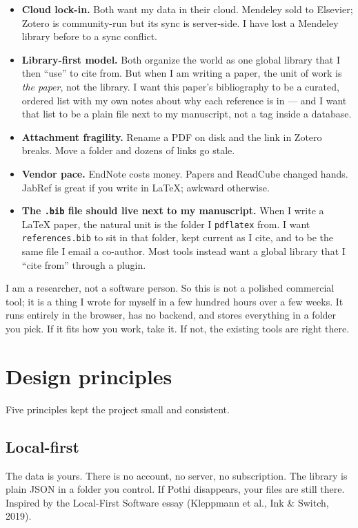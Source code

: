 \documentclass[11pt]{article}
\begin{document}
\begin{itemize}
\item \textbf{Cloud lock-in.} Both want my data in their cloud. Mendeley
sold to Elsevier; Zotero is community-run but its sync is server-side. I
have lost a Mendeley library before to a sync conflict.
\item \textbf{Library-first model.} Both organize the world as one global
library that I then ``use'' to cite from. But when I am writing a paper, the
unit of work is \emph{the paper}, not the library. I want this paper's
bibliography to be a curated, ordered list with my own notes about why each
reference is in --- and I want that list to be a plain file next to my
manuscript, not a tag inside a database.
\item \textbf{Attachment fragility.} Rename a PDF on disk and the link in
Zotero breaks. Move a folder and dozens of links go stale.
\item \textbf{Vendor pace.} EndNote costs money. Papers and ReadCube changed
hands. JabRef is great if you write in LaTeX; awkward otherwise.
\item \textbf{The \texttt{.bib} file should live next to my manuscript.}
When I write a LaTeX paper, the natural unit is the folder I
\texttt{pdflatex} from. I want \texttt{references.bib} to sit in that
folder, kept current as I cite, and to be the same file I email a
co-author. Most tools instead want a global library that I ``cite from''
through a plugin.
\end{itemize}

I am a researcher, not a software person. So this is not a polished commercial
tool; it is a thing I wrote for myself in a few hundred hours over a few
weeks. It runs entirely in the browser, has no backend, and stores everything
in a folder you pick. If it fits how you work, take it. If not, the existing
tools are right there.

\section{Design principles}

Five principles kept the project small and consistent.

\subsection{Local-first}

The data is yours. There is no account, no server, no subscription. The
library is plain JSON in a folder you control. If Pothi disappears, your
files are still there. Inspired by the Local-First Software essay (Kleppmann
et al., Ink \& Switch, 2019).
\end{document}
